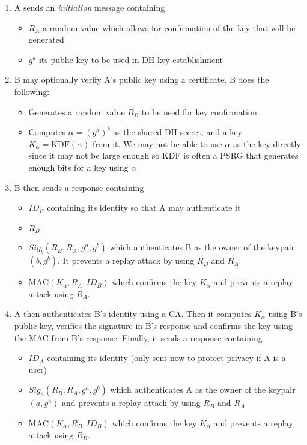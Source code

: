 \documentclass[11pt]{report}
\begin{document}
\begin{enumerate}
	\item A sends an \textit{initiation} message containing
	\begin{itemize}
		\item $R_A$ a random value which allows for confirmation of the key that will be generated
		\item $g^a$ its public key to be used in DH key establishment
	\end{itemize}
	\item B may optionally verify A's public key using a certificate. B does the following:
	\begin{itemize}
		\item Generates a random value $R_B$ to be used for key confirmation
		\item Computes $\alpha = (g^a)^b$ as the shared DH secret, and a key $K_\alpha = \text{KDF}(\alpha)$ from it. We may not be able to use $\alpha$ as the key directly since it may not be large enough so KDF is often a PSRG that generates enough bits for a key using $\alpha$
	\end{itemize}
	\item B then sends a response containing
	\begin{itemize}
		\item $ID_B$ containing its identity so that A may authenticate it
		\item $R_B$
		\item $Sig_{b}(R_B, R_A, g^a, g^b)$ which authenticates B as the owner of the keypair $(b, g^b)$. It prevents a replay attack by using $R_B$ and $R_A$.
		\item $\text{MAC}(K_\alpha, R_A, ID_B)$ which confirms the key $K_\alpha$ and prevents a replay attack using $R_A$.
	\end{itemize}
	\item A then authenticates B's identity using a CA. Then it computes $K_\alpha$ using B's public key, verifies the signature in B's response and confirms the key using the MAC from B's response. Finally, it sends a response containing
	\begin{itemize}
		\item $ID_A$ containing its identity (only sent now to protect privacy if A is a user)
		\item $Sig_{a}(R_B, R_A, g^a, g^b)$ which authenticates A as the owner of the keypair $(a, g^a)$ and prevents a replay attack by using $R_B$ and $R_A$
		\item $\text{MAC}(K_\alpha, R_B, ID_B)$ which confirms the key $K_\alpha$ and prevents a replay attack using $R_B$.
	\end{itemize}
\end{enumerate}
\end{document}
